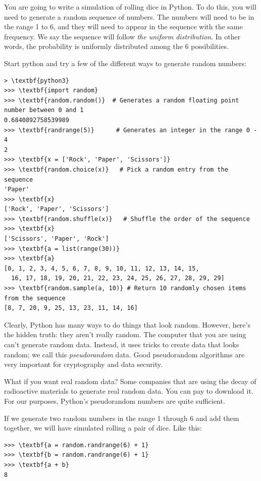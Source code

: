 You are going to write a simulation of rolling dice in Python. To do
this, you will need to generate a random sequence of numbers. The
numbers will need to be in the range 1 to 6, and they will need to
appear in the sequence with the same frequency.  We say the sequence
will follow \textit{the uniform distribution}. In other words, the
probability is uniformly distributed among the 6 possibilities.

Start python and try a few of the different ways to generate random numbers:
\begin{Verbatim}[commandchars=\\\{\}]
> \textbf{python3}
>>> \textbf{import random}
>>> \textbf{random.random()}  # Generates a random floating point number between 0 and 1
0.6840892758539989
>>> \textbf{randrange(5)}      # Generates an integer in the range 0 - 4
2
>>> \textbf{x = ['Rock', 'Paper', 'Scissors']}
>>> \textbf{random.choice(x)}   # Pick a random entry from the sequence
'Paper'
>>> \textbf{x}
['Rock', 'Paper', 'Scissors'] 
>>> \textbf{random.shuffle(x)}   # Shuffle the order of the sequence
>>> \textbf{x}
['Scissors', 'Paper', 'Rock']
>>> \textbf{a = list(range(30))}
>>> \textbf{a}
[0, 1, 2, 3, 4, 5, 6, 7, 8, 9, 10, 11, 12, 13, 14, 15,
  16, 17, 18, 19, 20, 21, 22, 23, 24, 25, 26, 27, 28, 29, 29]
>>> \textbf{random.sample(a, 10)} # Return 10 randomly chosen items from the sequence
[8, 7, 20, 9, 25, 13, 23, 11, 14, 16]
\end{Verbatim}
Clearly, Python has many ways to do things that look random. However, here's the hidden truth: they aren't really
random. The computer that you are using can't generate random
data. Instead, it uses tricks to create data that looks random; we
call this \textit{pseudorandom} data. Good pseudorandom algorithms are
very important for cryptography and data security.

What if you want real random data? Some companies that are using
the decay of radioactive materials to generate real random data. You
can pay to download it. For our purposes, Python's pseudorandom
numbers are quite sufficient.

If we generate two random numbers in the range 1 through 6 and add them together, we
will have simulated rolling a pair of dice. Like this:

\begin{Verbatim}[commandchars=\\\{\}]
>>> \textbf{a = random.randrange(6) + 1}
>>> \textbf{b = random.randrange(6) + 1}
>>> \textbf{a + b}
8
\end{Verbatim}

